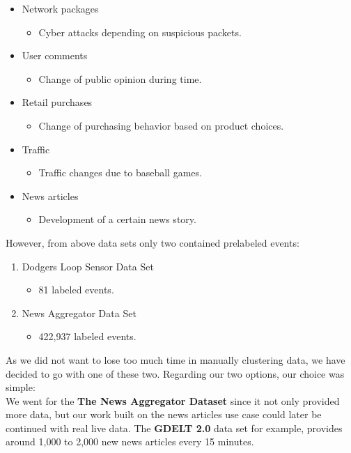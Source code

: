 \begin{itemize}
    \item Network packages
        \begin{itemize}
            \item Cyber attacks depending on suspicious packets.
        \end{itemize}
    \item User comments
        \begin{itemize}
            \item Change of public opinion during time.
        \end{itemize}
    \item Retail purchases
        \begin{itemize}
            \item Change of purchasing behavior based on product choices.
        \end{itemize}
    \item Traffic
        \begin{itemize}
            \item Traffic changes due to baseball games.
        \end{itemize}
    \item News articles
        \begin{itemize}
            \item Development of a certain news story.
        \end{itemize}
\end{itemize}

However, from above data sets only two contained prelabeled events:

\begin{enumerate}
    \item Dodgers Loop Sensor Data Set
        \begin{itemize}
            \item 81 labeled events. %
        \end{itemize}
    \item News Aggregator Data Set
        \begin{itemize}
            \item 422,937 labeled events. %
        \end{itemize}
\end{enumerate}

As we did not want to lose too much time in manually clustering data,
we have decided to go with one of these two.
Regarding our two options, our choice was simple:\\
We went for the \textbf{The News Aggregator Dataset} since it not only provided more data,
but our work built on the news articles use case could later be continued with real live data.
The \textbf{GDELT 2.0} data set for example, provides around 1,000 to 2,000 new news articles every 15 minutes.


